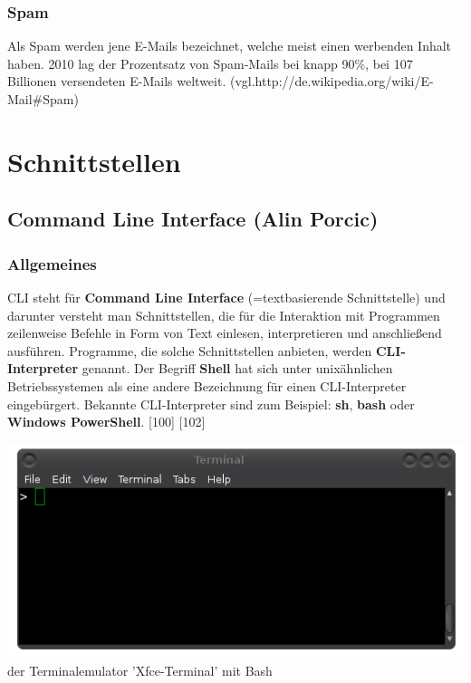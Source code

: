 \documentclass[12pt,a4paper]{report}
\begin{document}
\begin{onehalfspace}
\subsection{Spam}\label{sssec:Spam}
Als Spam werden jene E-Mails bezeichnet, welche meist einen werbenden Inhalt haben. 2010 lag der Prozentsatz von Spam-Mails bei knapp 90\%, bei 107 Billionen versendeten E-Mails weltweit.  (vgl.http://de.wikipedia.org/wiki/E-Mail\#Spam) 
\chapter{Schnittstellen}

\section{Command Line Interface (Alin Porcic)}
\subsection{Allgemeines}

CLI steht für \textbf{Command Line Interface} (=textbasierende Schnittstelle) und darunter versteht man Schnittstellen, die für die Interaktion mit Programmen zeilenweise Befehle in Form von Text einlesen, interpretieren und anschließend ausführen. Programme, die solche Schnittstellen anbieten, werden \textbf{CLI-Interpreter} genannt. Der Begriff \textbf{Shell} hat sich unter unixähnlichen Betriebssystemen als eine andere Bezeichnung für einen CLI-Interpreter eingebürgert. Bekannte CLI-Interpreter sind zum Beispiel: \textbf{sh}, \textbf{bash} oder \textbf{Windows PowerShell}. [100] [102]

\begin{center}
\includegraphics[scale=0.5]{img/cli_pic.png}\\
der Terminalemulator 'Xfce-Terminal' mit Bash
\end{center}


\end{onehalfspace}
\end{document}

